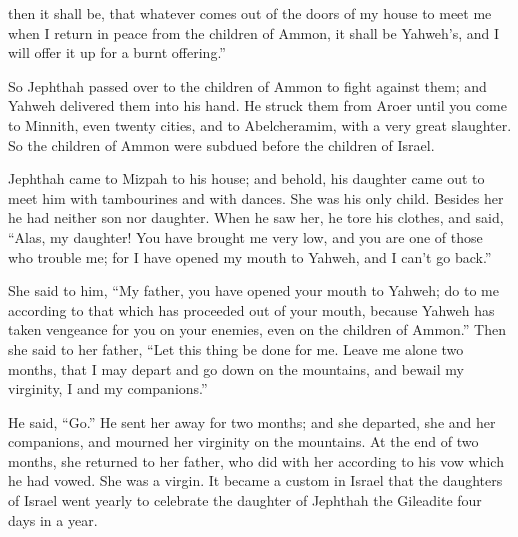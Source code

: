 {then it shall be, that whatever comes out of the doors of my house to meet me when I return in peace from the children of Ammon, it shall be Yahweh’s, and I will offer it up for a burnt offering.”
\par }{\PP {}So Jephthah passed over to the children of Ammon to fight against them; and Yahweh delivered them into his hand.
He struck them from Aroer until you come to Minnith, even twenty cities, and to Abelcheramim, with a very great slaughter. So the children of Ammon were subdued before the children of Israel.
\par }{\PP {}Jephthah came to Mizpah to his house; and behold, his daughter came out to meet him with tambourines and with dances. She was his only child. Besides her he had neither son nor daughter.
When he saw her, he tore his clothes, and said, “Alas, my daughter! You have brought me very low, and you are one of those who trouble me; for I have opened my mouth to Yahweh, and I can’t go back.”
\par }{\PP {}She said to him, “My father, you have opened your mouth to Yahweh; do to me according to that which has proceeded out of your mouth, because Yahweh has taken vengeance for you on your enemies, even on the children of Ammon.”
Then she said to her father, “Let this thing be done for me. Leave me alone two months, that I may depart and go down on the mountains, and bewail my virginity, I and my companions.”
\par }{\PP {}He said, “Go.” He sent her away for two months; and she departed, she and her companions, and mourned her virginity on the mountains.
At the end of two months, she returned to her father, who did with her according to his vow which he had vowed. She was a virgin. It became a custom in Israel
that the daughters of Israel went yearly to celebrate the daughter of Jephthah the Gileadite four days in a year.

}
